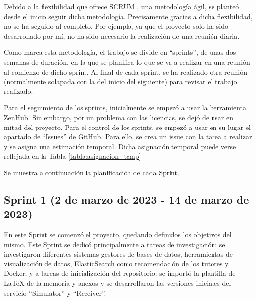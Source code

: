 Debido a la flexibilidad que ofrece SCRUM \cite{schwaber2001agile}, una metodología ágil, se planteó desde el inicio seguir dicha 
metodología. Precisamente gracias a dicha flexibilidad, no se ha seguido al completo. Por ejemplo, ya que 
el proyecto solo ha sido desarrollado por mí, no ha sido necesario la realización de una reunión diaria.

Como marca esta metodología, el trabajo se divide en ``sprints'', de unas dos semanas de duración, en la que 
se planifica lo que se va a realizar en una reunión al comienzo de dicho sprint. Al final de cada sprint, se
ha realizado otra reunión (normalmente solapada con la del inicio del siguiente) para revisar el trabajo realizado.

Para el seguimiento de los sprints, inicialmente se empezó a usar la herramienta ZenHub. Sin embargo, por un problema
con las licencias, se dejó de usar en mitad del proyecto. Para el control de los sprints, se empezó a usar en su 
lugar el apartado de ``Issues'' de GitHub. Para ello, se crea un issue con la tarea a realizar y se asigna una estimación 
temporal. Dicha asignación temporal puede verse reflejada en la Tabla \ref{tabla:asignacion_temp}


Se muestra a continuación la planificación de cada Sprint.

\subsection{Sprint 1 (2 de marzo de 2023 - 14 de marzo de 2023)}

En este Sprint se comenzó el proyecto, quedando definidos los objetivos del mismo. Este Sprint se dedicó principalmente 
a tareas de investigación: se investigaron diferentes sistemas gestores de bases de datos, herramientas de visualización 
de datos, ElasticSearch como recomendación de los tutores y Docker; y a tareas de inicialización del repositorio: se 
importó la plantilla de LaTeX de la memoria y anexos y se desarrollaron las versiones iniciales del servicio ``Simulator'' y 
``Receiver''.

